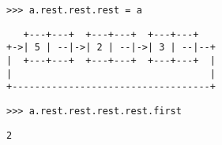 \begin{blocksection}
\begin{lstlisting}
>>> a.rest.rest.rest = a
\end{lstlisting}
\begin{solution}[0in]
\begin{lstlisting}
   +---+---+  +---+---+  +---+---+
+->| 5 | --|->| 2 | --|->| 3 | --|--+
|  +---+---+  +---+---+  +---+---+  |
|                                   |
+-----------------------------------+
\end{lstlisting}
\end{solution}

\begin{lstlisting}
>>> a.rest.rest.rest.rest.first
\end{lstlisting}
\begin{solution}[.25in]
\begin{lstlisting}
2
\end{lstlisting}
\end{solution}

\end{blocksection}
